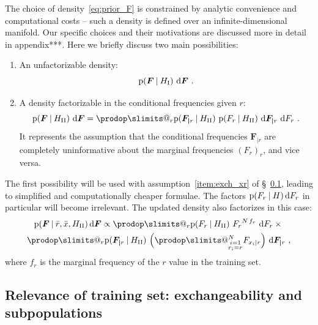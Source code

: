 \documentclass[\ifafour a4paper,12pt,\else a5paper,10pt,\fi%
onecolumn,oneside,article,%
british%
]{memoir}
\makeatletter
\theoremstyle{remark}
\theoremstyle{innote}
\def\prod{\DOTSI\prodop\slimits@}
\newcommand*{\di}{\mathrm{d}}%
\newcommand*{\p}{\mathrm{p}}%
\renewcommand*{\|}[1][]{\nonscript\:#1\vert\nonscript\:\mathopen{}}
\renewcommand*{\=}{\TextOrMath\texteq\eq}
\newcommand*{\sect}{\S}%
\newcommand*{\wrench}{{\fontencoding{U}\fontfamily{fontawesomethree}\selectfont\symbol{114}}}
\newcommand{\mynote}[1]{ {\color{notecolour}#1}}
\newcommand*{\q}{}%
\DeclareRobustCommand*{\q}{%
  \mathord{\mathpalette\bigcdot@{}}%
}
\newcommand*{\bigcdot@scalefactor}{0.7}
\newcommand*{\bigcdot@widthfactor}{1.5}
\newcommand*{\bigcdot@}[2]{%
  \sbox0{$#1\vcenter{}$}%
  \sbox2{$#1\cdot\m@th$}%
  \hbox to \bigcdot@widthfactor\wd2{%
    \hfil
    \raise\ht0\hbox{%
      \scalebox{\bigcdot@scalefactor}{%
        \lower\ht0\hbox{$#1\bullet\m@th$}%
      }%
    }%
    \hfil
  }%
}
\newcommand*{\ro}{r}
\newcommand*{\rd}{\bar{r}}
\newcommand*{\xd}{\bar{x}}
\newcommand*{\yF}{\bm{F}}
\newcommand*{\yFr}{\yF_{\bm{\mid}r}}
\makeatother
\begin{document}
The choice of density~\eqref{eq:prior_F} is constrained by analytic
convenience and computational costs -- such a density is defined over an
infinite-dimensional manifold. Our specific choices and their motivations are
discussed more in detail in \mynote{\wrench appendix***}. Here we briefly
discuss two main possibilities:
\begin{enumerate}[label=\Roman*.]
\item\label{item:p_F_unfactorizable} An unfactorizable density:
    \begin{equation}
    \label{eq:p_F_unfactorizable}
    \p(\yF\| H_{\textrm{I}})\ \di\yF 
    \ .
  \end{equation}

\item\label{item:p_F_factorizable} A density factorizable in the
  conditional frequencies given $r$:
  \begin{equation}
    \label{eq:p_F_factorizable}
    \p(\yF\| H_{\textrm{II}})\ \di\yF =
    \prod_{r} \p(\yFr \| H_{\textrm{II}})\
    \p(F_{r\q} \| H_{\textrm{II}})\ \di\yFr\ \di F_{r\q} \ .
  \end{equation}
  It represents the assumption that the conditional frequencies $\yFr$ are
  completely uninformative about the marginal frequencies $(F_{r\q})_{r}$,
  and vice versa.
\end{enumerate}
The first possibility will be used with assumption~\ref{item:exch_xr} of
\sect~\ref{sec:hyp_exch}, leading to simplified and computationally cheaper
formulae. The factors $\p(F_{r\q} \| H)\,\di F_{r\q}$ in particular will
become irrelevant. The updated density also factorizes in this case:
  \begin{multline}
  \label{eq:post_prob_F_factorizable}
  \p(\yF\|\rd,\xd, H_{\textrm{II}})\,\di\yF \propto
  \prod_{r} \p(F_{r\q} \| H_{\textrm{II}})\ {F_{r\q}}^{N\,f_{r\q}}\
  \di F_{r\q} \times{}\\
  \prod_{r} \p(\yFr \| H_{\textrm{II}})\
  \Bigl(\prod_{\substack{i=1\\r_{i}=\ro}}^{N} F_{x_{i}\mid \ro}\Bigr)\ \di\yFr \ ,
\end{multline}
where $f_{r\q}$ is the marginal frequency of the $r$ value in the training set.


\subsection{Relevance of training set: exchangeability and subpopulations}
\label{sec:hyp_exch}
\end{document}

